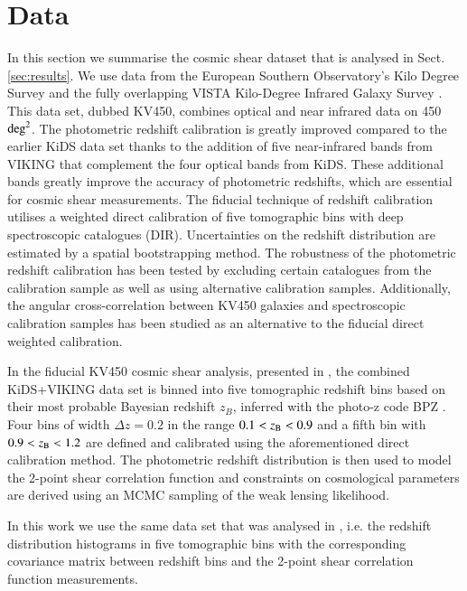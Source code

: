 \documentclass{aa}
\begin{document}
\section{Data}
\label{sec:data}
In this section we summarise the cosmic shear dataset that is analysed in Sect. \ref{sec:results}.
We use data from the European Southern Observatory's Kilo Degree Survey \citep[KiDS; ][]{2015MNRAS.454.3500K,2015A&A...582A..62D,2017A&A...604A.134D} and the fully overlapping VISTA Kilo-Degree Infrared Galaxy Survey \citep[VIKING; ][]{2013Msngr.154...32E}. This data set, dubbed KV450, combines optical and near infrared data on 450 ${\rm deg}^2$. The photometric redshift calibration is greatly improved compared to the earlier KiDS data set \citep{2017MNRAS.465.1454H} thanks to the addition of five near-infrared bands from VIKING that complement the four optical bands from KiDS. These additional bands greatly improve the accuracy of photometric redshifts, which are essential for cosmic shear measurements. The fiducial technique of redshift calibration utilises a weighted direct calibration of five tomographic bins with deep spectroscopic catalogues (DIR). Uncertainties on the redshift distribution are estimated by a spatial bootstrapping method. The robustness of the photometric redshift calibration has been tested by excluding certain catalogues from the calibration sample as well as using alternative calibration samples. Additionally, the angular cross-correlation between KV450 galaxies and spectroscopic calibration samples has been studied as an alternative to the fiducial direct weighted calibration.

In the fiducial KV450 cosmic shear analysis, presented in \cite{hildebrandt18}, the combined KiDS+VIKING data set \citep{2019A&A...632A..34W} is binned into five tomographic redshift bins based on their most probable Bayesian redshift $z_B$, inferred with the photo-z code {\sc BPZ} \citep{2000ApJ...536..571B}. Four bins of width $\Delta z = 0.2$ in the range $0.1 < z_{\rm B} <0.9$ and a fifth bin with $0.9 < z_{\rm B} < 1.2$ are defined and calibrated using the aforementioned direct calibration method. The photometric redshift distribution is then used to model the 2-point shear correlation function and constraints on cosmological parameters are derived using an MCMC sampling of the weak lensing likelihood. 

In this work we use the same data set that was analysed in \cite{hildebrandt18}, i.e. the redshift distribution histograms in five tomographic bins with the corresponding covariance matrix between redshift bins and the 2-point shear correlation function measurements.
\end{document}
